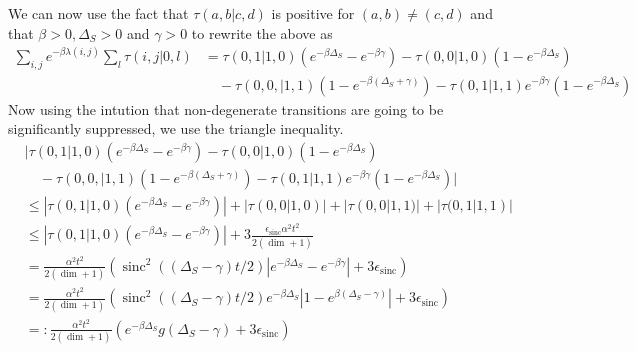 \documentclass{article}
\newcommand{\parens}[1]{\left( #1 \right)}
\newcommand{\abs}[1]{\left| #1 \right|}
\DeclareMathOperator{\sinc}{sinc}
\begin{document}
    We can now use the fact that $\tau(a,b|c,d)$ is positive for $(a,b) \neq (c,d)$ and that $\beta > 0, \Delta_S > 0$ and $\gamma > 0$ to rewrite the above as
    \begin{align}
        \sum_{i,j} e^{-\beta \lambda(i,j)} \sum_l \tau(i,j|0,l) &= \tau(0,1|1,0)(e^{-\beta \Delta_S} - e^{-\beta \gamma}) - \tau(0,0|1,0)(1 - e^{-\beta \Delta_S})  \nonumber \\
        &\quad - \tau(0,0,| 1,1) (1 - e^{-\beta (\Delta_S + \gamma)}) - \tau(0,1|1,1) e^{-\beta \gamma} (1 - e^{-\beta \Delta_S})
    \end{align}
    Now using the intution that non-degenerate transitions are going to be significantly suppressed, we use the triangle inequality. 
    \begin{align}
        &\bigg| \tau(0,1|1,0)(e^{-\beta \Delta_S} - e^{-\beta \gamma}) - \tau(0,0|1,0)(1 - e^{-\beta \Delta_S})  \nonumber \\
        &\quad - \tau(0,0,| 1,1) (1 - e^{-\beta (\Delta_S + \gamma)}) - \tau(0,1|1,1) e^{-\beta \gamma} (1 - e^{-\beta \Delta_S})\bigg| \\
        &\leq \abs{\tau(0,1|1,0) (e^{-\beta \Delta_S} - e^{-\beta \gamma})} + \abs{\tau(0,0|1,0)} + |\tau(0,0|1,1)| + |\tau(0,1|1,1)| \\
        &\leq \abs{\tau(0,1|1,0) (e^{-\beta \Delta_S} - e^{-\beta \gamma})} + 3 \frac{\epsilon_{\sinc} \alpha^2 t^2}{2(\dim + 1)} \\
        &= \frac{\alpha^2 t^2}{2(\dim + 1)} \parens{\sinc^2((\Delta_S - \gamma)t/2) |e^{-\beta \Delta_S} - e^{-\beta \gamma}| + 3 \epsilon_{\sinc}}\\
        &= \frac{\alpha^2 t^2}{2 (\dim + 1)} \parens{\sinc^2((\Delta_S - \gamma)t/2) e^{-\beta \Delta_S} |1 - e^{\beta (\Delta_S - \gamma)}| + 3 \epsilon_{\sinc}} \\
        &=: \frac{\alpha^2 t^2}{2(\dim + 1)} (e^{-\beta \Delta_S} g(\Delta_S - \gamma) + 3 \epsilon_{\sinc})
    \end{align}
\end{document}
